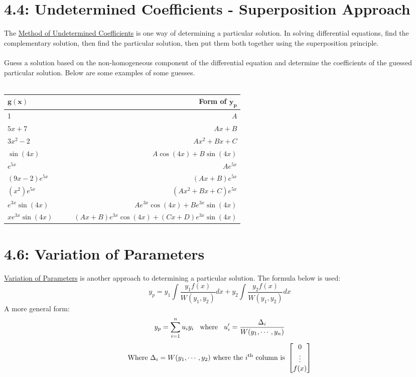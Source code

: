 \documentclass{article}
\begin{document}
\section*{4.4: Undetermined Coefficients - Superposition Approach}
The \underline{Method of Undetermined Coefficients} is one way of determining a particular solution. In solving differential equations, find the complementary solution, then find the particular solution, then put them both together using the superposition principle. \\\\
Guess a solution based on the non-homogeneous component of the differential equation and determine the coefficients of the guessed particular solution. Below are some examples of some guesses.\\\\
\def\arraystretch{1.5}%
\begin{tabularx}{\textwidth}{l X X r}
\toprule
\(\bm{g(x)}\) &&& \textbf{Form of} \(\bm{y_p}\) \\
\midrule
1 &&& \(A\) \\
\(5x+7\) &&& \(Ax+B\) \\
\(3x^2-2\) &&& \(Ax^2+Bx+C\) \\
\(\sin(4x)\) &&& \(A\cos(4x)+B\sin(4x)\) \\
\(e^{5x}\) &&& \(Ae^{5x}\) \\
\((9x-2)e^{5x}\) &&& \((Ax+B)e^{5x}\) \\
\((x^2)e^{5x}\) &&& \((Ax^2+Bx+C)e^{5x}\) \\
\(e^{3x}\sin(4x)\) &&& \(Ae^{3x}\cos(4x)+Be^{3x}\sin(4x)\) \\
\(xe^{3x}\sin(4x)\) &&& \((Ax+B)e^{3x}\cos(4x)+(Cx+D)e^{3x}\sin(4x)\) \\
\bottomrule
\end{tabularx}
\section*{4.6: Variation of Parameters}
\underline{Variation of Parameters} is another approach to determining a particular solution. The formula below is used:
\[y_p=y_1\int\frac{y_1f(x)}{W(y_1,y_2)}dx+y_2\int\frac{y_2f(x)}{W(y_1,y_2)}dx\]
A more general form:
\[y_p=\sum_{i=1}^nu_iy_i\hspace{3 mm}\textnormal{where}\hspace{3 mm}u_i'=\frac{\Delta_i}{W(y_1,\cdots,y_n)}\]
\[\textnormal{Where } \Delta_i = W(y_1,\cdots,y_2) \text{ where the } i^\textnormal{th} \textnormal{ column is }
\begin{bmatrix}
0 \\
\vdots \\
f(x)
\end{bmatrix}
\]
\end{document}
